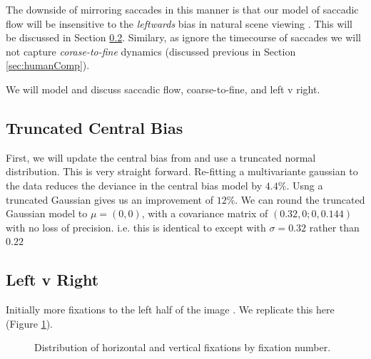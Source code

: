 The downside of mirroring saccades in this manner is that our model of saccadic flow will be insensitive to the \textit{leftwards} bias in natural scene viewing \citep{nuthmann-matthias2014}. This will be discussed in Section \ref{sec:LeftRight}. Similary, as ignore the timecourse of saccades we will not capture \textit{corase-to-fine} dynamics (discussed previous in Section \ref{sec:humanComp}).

We will model and discuss saccadic flow, coarse-to-fine, and left v right. 

\subsection{Truncated Central Bias}
\label{sec:truncatedCentral}
First, we will update the central bias from \cite{clarke-tatler2014} and use a truncated normal distribution. This is very straight forward. Re-fitting a multivariante gaussian to the data reduces the deviance in the central bias model by $4.4\%$. Usng a truncated Gaussian gives us an improvement of $12\%$. We can round the truncated Gaussian model to $\mu = (0,0)$, with a covariance matrix of $(0.32, 0; 0, 0.144)$ with no loss of precision. i.e. this is identical to \cite{clarke-tatler2014} except with $\sigma=0.32$ rather than $0.22$

\subsection{Left v Right}
\label{sec:LeftRight}

Initially more fixations to the left half of the image \citep{nuthmann-matthias2014}. We replicate this here (Figure \ref{fig:leftrightDist}).

\begin{figure}
\centering
{}
\caption{Distribution of horizontal and vertical fixations by fixation number.}
\label{fig:leftrightDist}
\end{figure}

